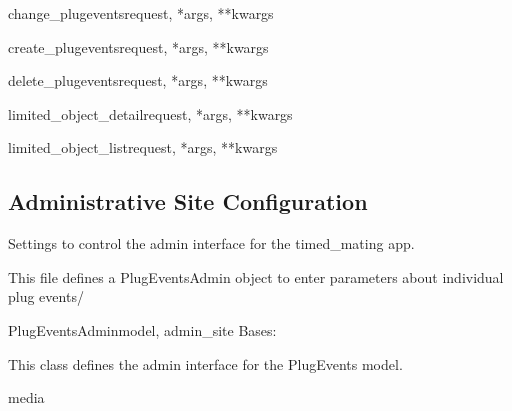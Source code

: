 \documentclass[letterpaper,10pt,english]{sphinxmanual}
\begin{document}
\hypertarget{timed\_mating.urls.change\_plugevents}{}\begin{funcdesc}{change\_plugevents}{request, *args, **kwargs}\end{funcdesc}

\hypertarget{timed\_mating.urls.create\_plugevents}{}\begin{funcdesc}{create\_plugevents}{request, *args, **kwargs}\end{funcdesc}

\hypertarget{timed\_mating.urls.delete\_plugevents}{}\begin{funcdesc}{delete\_plugevents}{request, *args, **kwargs}\end{funcdesc}

\hypertarget{timed\_mating.urls.limited\_object\_detail}{}\begin{funcdesc}{limited\_object\_detail}{request, *args, **kwargs}\end{funcdesc}

\hypertarget{timed\_mating.urls.limited\_object\_list}{}\begin{funcdesc}{limited\_object\_list}{request, *args, **kwargs}\end{funcdesc}


\subsection{Administrative Site Configuration}
\hypertarget{module-timed\_mating.admin}{}
\modulesynopsis{}
Settings to control the admin interface for the timed\_mating app.

This file defines a PlugEventsAdmin object to enter parameters about individual plug events/

\hypertarget{timed\_mating.admin.PlugEventsAdmin}{}\begin{classdesc}{PlugEventsAdmin}{model, admin\_site}
Bases: 

This class defines the admin interface for the PlugEvents model.

\hypertarget{timed\_mating.admin.PlugEventsAdmin.media}{}\begin{memberdesc}{media}\end{memberdesc}
\end{classdesc}
\end{document}
